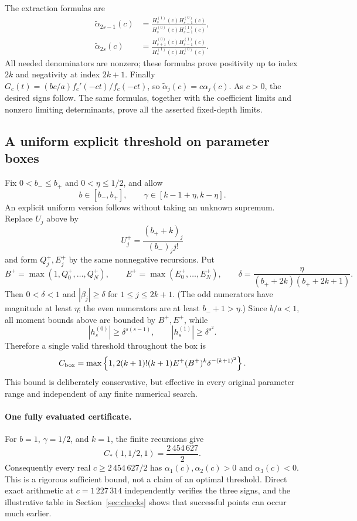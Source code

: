 \documentclass[11pt,a4paper]{article}
\theoremstyle{remark}
\begin{document}
The extraction formulas are
\begin{align*}
 \widetilde\alpha_{2s-1}(c)
 &=\frac{H_s^{(1)}(c)H_{s-1}^{(0)}(c)}
        {H_s^{(0)}(c)H_{s-1}^{(1)}(c)},\\
 \widetilde\alpha_{2s}(c)
 &=\frac{H_{s+1}^{(0)}(c)H_{s-1}^{(1)}(c)}
        {H_s^{(1)}(c)H_s^{(0)}(c)}.
\end{align*}
All needed denominators are nonzero; these formulas prove positivity up
to index $2k$ and negativity at index $2k+1$. Finally
$G_c(t)=(bc/a)f_c'(-ct)/f_c(-ct)$, so
$\widetilde\alpha_j(c)=c\alpha_j(c)$. As $c>0$, the desired signs follow.
The same formulas, together with the coefficient limits and nonzero
limiting determinants, prove all the asserted fixed-depth limits.

\subsection{A uniform explicit threshold on parameter boxes}
Fix $0<b_-\le b_+$ and $0<\eta\le1/2$, and allow
\[
 b\in[b_-,b_+],\qquad \gamma\in[k-1+\eta,k-\eta].
\]
An explicit uniform version follows without taking an unknown supremum.
Replace $U_j$ above by
\[
 U_j^+=\frac{(b_++k)_j}{(b_-)_j j!}
\]
and form $Q_j^+,E_j^+$ by the same nonnegative recursions. Put
\[
 B^+=\max(1,Q_0^+,\ldots,Q_N^+),\qquad
 E^+=\max(E_0^+,\ldots,E_N^+),\qquad
 \delta=\frac{\eta}{(b_++2k)(b_++2k+1)}.
\]
Then $0<\delta<1$ and $|\beta_j|\ge\delta$ for $1\le j\le2k+1$.
(The odd numerators have magnitude at least $\eta$; the even numerators
are at least $b_-+1>\eta$.) Since $b/a<1$, all moment bounds above are
bounded by $B^+,E^+$, while
\[
 |h_s^{(0)}|\ge\delta^{s(s-1)},\qquad
 |h_s^{(1)}|\ge\delta^{s^2}.
\]
Therefore a single valid threshold throughout the box is
\[
 C_{\rm box}=\max\left\{1,
 2(k+1)!(k+1)E^+(B^+)^k\delta^{-(k+1)^2}\right\}.
\]
This bound is deliberately conservative, but effective in every original
parameter range and independent of any finite numerical search.

\paragraph{One fully evaluated certificate.}
For $b=1$, $\gamma=1/2$, and $k=1$, the finite recursions give
\[
 C_*(1,1/2,1)=\frac{2\,454\,627}{2}.
\]
Consequently every real $c\ge2\,454\,627/2$ has
$\alpha_1(c),\alpha_2(c)>0$ and $\alpha_3(c)<0$.
This is a rigorous sufficient bound, not a claim of an optimal threshold.
Direct exact arithmetic at $c=1\,227\,314$ independently verifies the
three signs, and the illustrative table in Section~\ref{sec:checks}
shows that successful points can occur much earlier.
\end{document}
